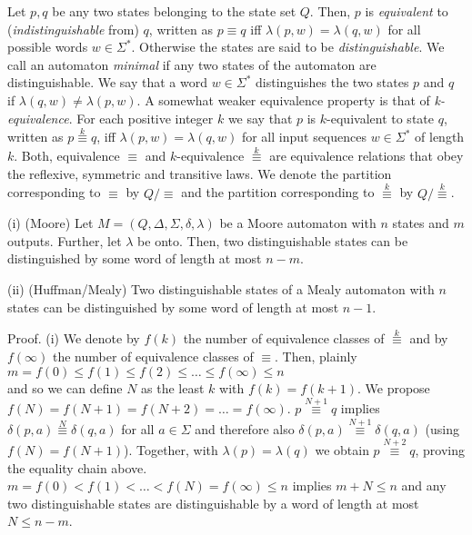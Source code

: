 Let $p,q$ be any two states belonging to the state set $Q$.
Then, $p$ is {\em equivalent} to ({\em indistinguishable} from) $q$,
written as $p \equiv q$ iff $\lambda(p,w) = \lambda(q,w)$
for all possible words $w \in \Sigma^*$. Otherwise the states
are said to be {\em distinguishable}.
We call an automaton {\em minimal} if any two states of the automaton
are distinguishable.
We say that a word $w \in \Sigma^*$ distinguishes the two states
$p$ and $q$ if $\lambda(q,w) \neq \lambda(p,w)$.
A somewhat weaker equivalence property is that of {\em k-equivalence}.
For each positive integer $k$ we say that $p$ is $k$-equivalent
to state $q$, written as $p \stackrel{k}{\equiv} q$,
iff $\lambda(p,w) = \lambda(q,w)$ for all input sequences $w \in \Sigma^*$
of length $k$.
Both, equivalence $\equiv$ and $k$-equivalence $\stackrel{k}{\equiv}$
are equivalence relations that obey the reflexive, symmetric and transitive
laws.
We denote the partition corresponding to $\equiv$ by $Q/\equiv$
and the partition corresponding to $\stackrel{k}{\equiv}$ by
$Q/\stackrel{k}{\equiv}$.

\begin{theorem}
(i) (Moore)
Let $M=(Q,\Delta,\Sigma,\delta,\lambda)$ be a Moore automaton with $n$
states and $m$ outputs.
Further, let $\lambda$ be onto.
Then, two distinguishable states can be distinguished by some word
of length at most $n-m$.

(ii) (Huffman/Mealy)
Two distinguishable states of a Mealy automaton  with $n$ states
can be distinguished by some word of length at most $n-1$.
\end{theorem}

Proof.
(i) We denote by $f(k)$ the number of equivalence classes of
$\stackrel{k}{\equiv}$ and by $f(\infty)$ the number of
equivalence classes of $\equiv$.
Then, plainly \\
$m = f(0) \le f(1) \le f(2) \le \ldots \le f(\infty) \le n$ \\
and so we can define $N$ as the least $k$ with $f(k) = f(k+1)$.
We propose $f(N) = f(N+1) = f(N+2) = \ldots = f(\infty)$.
$p \stackrel{N+1}{\equiv} q$ implies
$\delta(p,a) \stackrel{N}{\equiv}
\delta(q,a)$
for all $a \in \Sigma$ and therefore also
$\delta(p,a) \stackrel{N+1}{\equiv}
\delta(q,a)$ (using $f(N) = f(N+1)$).
Together, with $\lambda(p) = \lambda(q)$ we obtain
$p \stackrel{N+2}{\equiv}
q$, proving the equality chain above. \\
$m = f(0) < f(1) < \ldots < f(N) = f(\infty) \le n$
implies $m + N \le n$ and any two distinguishable states are
distinguishable by a word of length at most $N \le n-m$.

